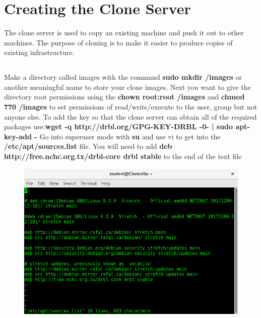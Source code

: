 \documentclass{article}
\begin{document}
\section{Creating the Clone Server}
The clone server is used to copy an existing machine and push it out to other machines. The purpose of cloning is to make it easier to produce copies of existing infrastructure. 
\subsection{}
Make a directory called images with the command \textbf{sudo mkdir /images} or another meaningful name to store your clone images. Next you want to give the directory root permissions using the \textbf{chown root:root /images} and \textbf{chmod 770 /images} to set permissions of read/write/execute to the user, group but not anyone else.\newline \newline
To add the key so that the clone server can obtain all of the required packages use:\newline\textbf{wget -q http://drbl.org/GPG-KEY-DRBL -0- | sudo apt-key-add -}
\newline
Go into superuser mode with \textbf{su} and use vi to get into the \textbf{/etc/apt/sources.list} file. 
\newline
You will need to add \textbf{deb http://free.nchc.org.tx/drbl-core drbl stable} to the end of the text file
\begin{figure}[h]
	\centering
	\includegraphics[width=1\linewidth]{"Screenshots-clone-server/Screenshot from 2018-03-10 13-33-36"}
\end{figure}
\newpage
\end{document}
